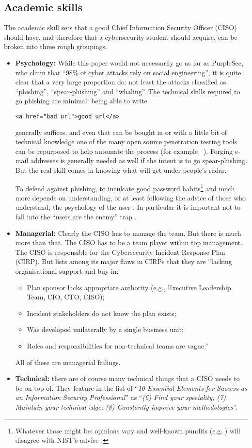 \documentclass[conference]{IEEEtran}
\begin{document}
\subsection{Academic skills}\label{sec:academic}
The academic skill sets that a good Chief Information Security Officer (CISO) should have, and therefore that a cybersecurity student should acquire, can be broken into three rough groupings.
\begin{itemize}
\item{\bf Psychology:} While this paper would not necessarily go as far as PurpleSec, who claim \cite{PurpleSec2020a} that ``98\% of cyber attacks rely on social engineering'', it is quite clear that a very large proportion do: not least the attacks classified as ``phishing'', ``spear-phishing'' and ``whaling''. The technical skills required to go phishing are minimal: being able to write
\begin{verbatim}
<a href="bad url">good url</a>
\end{verbatim}
generally suffices, and even that can be bought in or with a little bit of technical knowledge one of the many open source penetration testing tools can be repurposed to help automate the process (for example ~\cite{goPhish,king-Phisher}).  Forging e-mail addresses is generally needed as well if the intent is to go spear-phishing. But the real skill comes in knowing what will get under people's radar.
\par
To defend against phishing, to inculcate good password habits\footnote{Whatever those might be: opinions vary and well-known pundits (e.g. \cite{Grimes2019b}) will disagree with NIST's advice \cite{NIST2019e}.} and much more depends on understanding, or at least following the advice of those who understand, the psychology of the user \cite{InglesantSasse2010a}. In particular it is important not to fall into the ``users are the enemy'' trap \cite{AdamsSasse1999}.
\item{\bf Managerial:} Clearly the CISO has to manage the team. But there is much more than that. The CISO has to be a team player within top management. The CISO is responsible for the Cybersecurity Incident Response Plan (CIRP). But \cite{Secureworks2019a} lists among its major flaws in CIRPs that they are ``lacking organisational support and buy-in:
\begin{itemize}
\item Plan sponsor lacks appropriate authority
(e.g., Executive Leadership Team, CIO, CTO, CISO);
\item Incident stakeholders do not know the plan exists;
\item Was developed unilaterally by a single business unit;
\item Roles and responsibilities for non-technical teams are vague.''
\end{itemize}
All of these are managerial failings.
\item{\bf Technical:} there are of course many technical things that a CISO needs to be on top of.  They feature in the list \cite{Beaver2017a} of ``{\emph{10 Essential Elements for Success as an Information Security Professional}}'' as ``{\emph{(6) Find your speciality; (7) Maintain your technical edge; (8) Constantly improve your methodologies}}''.


\end{itemize}
\end{document}
